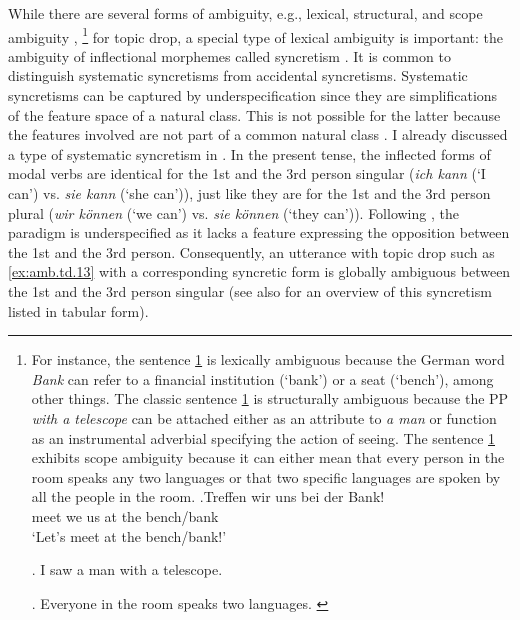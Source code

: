 While there are several forms of ambiguity,  e.g., lexical, structural, and scope ambiguity \citep{wasow2015},%
\footnote{For instance, the sentence \ref{ex:amb.lexical} is lexically ambiguous  because the German word \textit{Bank} can refer to a financial institution (`bank') or a seat (`bench'), among other things.
The classic sentence \ref{ex:amb.struct} is structurally ambiguous because the PP \textit{with a telescope} can be attached either as an attribute to \textit{a man} or function as an instrumental adverbial specifying the action of seeing.
The sentence \ref{ex:amb.scope} exhibits scope ambiguity because it can either mean that every person in the room speaks any two languages or that two specific languages are spoken by all the people in the room. %
\exg.\label{ex:amb.lexical}Treffen wir uns bei der Bank!\\
meet we us at the bench/bank\\
`Let's meet at the bench/bank!'\par %
\ex.\label{ex:amb.struct} I saw a man with a telescope. \par %
\ex.\label{ex:amb.scope} Everyone in the room speaks two languages. \citep[35]{wasow2015} \par %
}
%
for topic drop, a special type of lexical ambiguity  is important: the ambiguity of inflectional morphemes called syncretism \citep{wasow.etal2005}. 
It is common to distinguish systematic syncretisms from accidental syncretisms.
Systematic syncretisms can be captured by underspecification since they are simplifications of the feature space of a natural class.
This is not possible for the latter because the features involved are not part of a common natural class \citep{korth2017}.
I already discussed a type of systematic syncretism in .
In the present tense, the inflected forms of modal verbs  are identical for the 1st and the 3rd person singular (\textit{ich kann} (`I can') vs. \textit{sie kann} (`she can')), just like they are for the 1st and the 3rd person plural (\textit{wir können} (`we can') vs. \textit{sie können} (`they can')).
Following  \citet{korth2017}, the paradigm is underspecified as it lacks a feature expressing the opposition between the 1st and the 3rd person.
Consequently, an utterance with topic drop such as \ref{ex:amb.td.13} with a corresponding syncretic form is globally ambiguous between the 1st and the 3rd person singular (see also \cite[10]{trutkowski2016} for an overview of this syncretism listed in tabular form).

